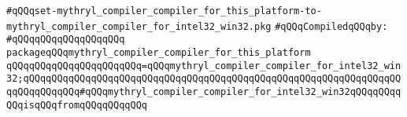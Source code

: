 \label{src/lib/core/mythryl-compiler-compiler/set-mythryl_compiler_compiler_for_this_platform-to-mythryl_compiler_compiler_for_intel32_win32.pkg}
\verb|#qQQqset-mythryl_compiler_compiler_for_this_platform-to-mythryl_compiler_compiler_for_intel32_win32.pkg|\newline
\newline
\verb|#qQQqCompiledqQQqby:|\newline
\verb|#qQQqqQQqqQQqqQQqqQQq|\newline
\newline
\verb|packageqQQqmythryl_compiler_compiler_for_this_platform|\newline
\verb|qQQqqQQqqQQqqQQqqQQqqQQq=qQQqmythryl_compiler_compiler_for_intel32_win32;qQQqqQQqqQQqqQQqqQQqqQQqqQQqqQQqqQQqqQQqqQQqqQQqqQQqqQQqqQQqqQQqqQQqqQQqqQQqqQQq#qQQqmythryl_compiler_compiler_for_intel32_win32qQQqqQQqqQQqisqQQqfromqQQqqQQqqQQq|\newline

